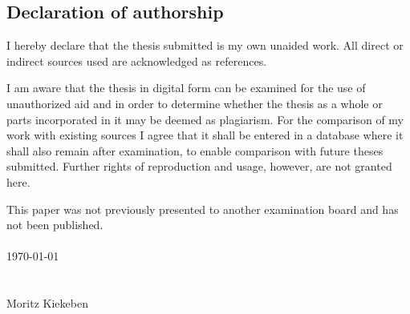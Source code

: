 \subsection*{Declaration of authorship}

I hereby declare that the thesis submitted is my own unaided work. All direct or indirect sources used are acknowledged as references.

I am aware that the thesis in digital form can be examined for the use of unauthorized  aid  and  in  order  to  determine  whether  the  thesis  as  a  whole  or  parts  incorporated in it may be deemed as plagiarism. For the comparison of my work with existing sources I agree that it shall be entered in a database where it shall also remain after examination, to enable comparison with future theses submitted. Further rights of reproduction and usage, however, are not granted here.

This paper was not previously presented to another examination board and has not been published.
\\\\
\today \\\\\\
Moritz Kiekeben
